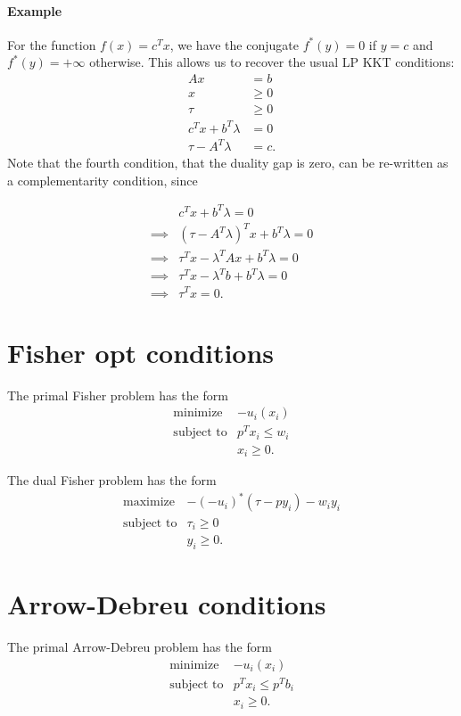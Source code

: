 \documentclass[12pt]{article}
\begin{document}
\paragraph{Example}
For the function $f(x) = c^T x$, we have the conjugate
$f^*(y) = 0$ if $y=c$ and $f^*(y) = +\infty$ otherwise.
This allows us to recover the usual LP KKT conditions:
\begin{align*}
A x &= b \\
x &\geq 0 \\
\tau &\geq 0 \\
c^T x + b^T \lambda &= 0\\
\tau - A^T \lambda &= c.
\end{align*}
Note that the fourth condition, that the duality gap is zero, can be
re-written as a complementarity condition, since

\begin{align*}
& c^T x + b^T \lambda = 0 \\
\implies& (\tau - A^T \lambda)^T x + b^T \lambda = 0 \\
\implies& \tau^Tx - \lambda^T A x + b^T \lambda = 0 \\
\implies& \tau^Tx - \lambda^T b + b^T \lambda = 0 \\
\implies& \tau^Tx  = 0.
\end{align*}

\section{Fisher opt conditions}
The primal Fisher problem has the form
\[
\begin{array}{ll}
\mbox{minimize} & - u_i(x_i)\\
\mbox{subject to} & p^T x_i \leq w_i\\
& x_i \geq 0.
\end{array}
\]

The dual Fisher problem has the form
\[
\begin{array}{ll}
\mbox{maximize} & -(-u_i)^*(\tau - p y_i) - w_i y_i\\
\mbox{subject to} & \tau_i \geq 0\\
& y_i \geq 0.
\end{array}
\]

\section{Arrow-Debreu conditions}
The primal Arrow-Debreu problem has the form
\[
\begin{array}{ll}
\mbox{minimize} & - u_i(x_i)\\
\mbox{subject to} & p^T x_i \leq p^T b_i\\
& x_i \geq 0.
\end{array}
\]
\end{document}
